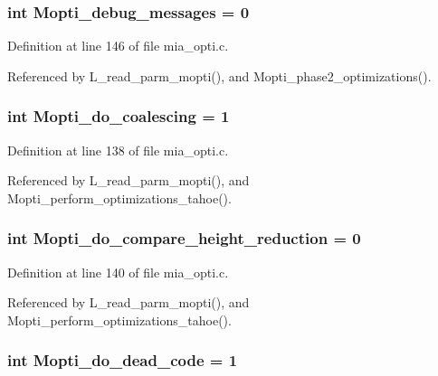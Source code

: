\subsubsection{\setlength{\rightskip}{0pt plus 5cm}int \bf{Mopti\_\-debug\_\-messages} = 0}\label{mia__opti_8c_a3765515b3e09be198267ef29d84be58}




Definition at line 146 of file mia\_\-opti.c.

Referenced by L\_\-read\_\-parm\_\-mopti(), and Mopti\_\-phase2\_\-optimizations().
\subsubsection{\setlength{\rightskip}{0pt plus 5cm}int \bf{Mopti\_\-do\_\-coalescing} = 1\hspace{0.3cm}{\tt  [static]}}\label{mia__opti_8c_b33ccb053f8564ebe14188666d0b8400}




Definition at line 138 of file mia\_\-opti.c.

Referenced by L\_\-read\_\-parm\_\-mopti(), and Mopti\_\-perform\_\-optimizations\_\-tahoe().
\subsubsection{\setlength{\rightskip}{0pt plus 5cm}int \bf{Mopti\_\-do\_\-compare\_\-height\_\-reduction} = 0}\label{mia__opti_8c_ec0d753452d49056ce88896a11e5c07a}




Definition at line 140 of file mia\_\-opti.c.

Referenced by L\_\-read\_\-parm\_\-mopti(), and Mopti\_\-perform\_\-optimizations\_\-tahoe().
\subsubsection{\setlength{\rightskip}{0pt plus 5cm}int \bf{Mopti\_\-do\_\-dead\_\-code} = 1\hspace{0.3cm}{\tt  [static]}}\label{mia__opti_8c_319796a6594f619cc0efe25feb90c54d}




